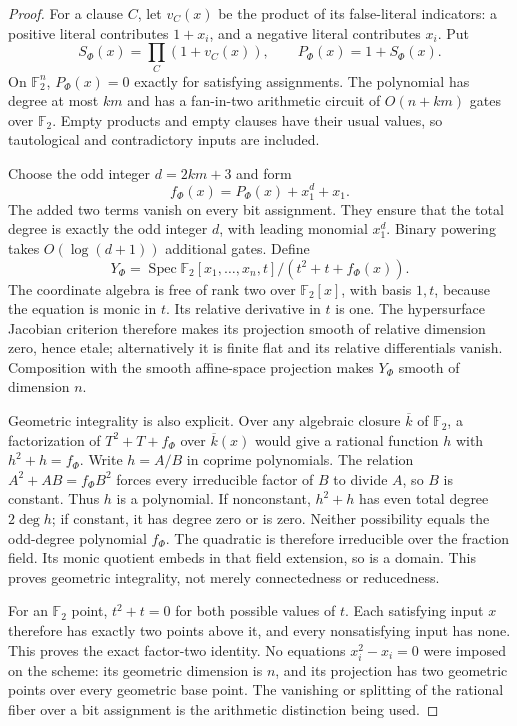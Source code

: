 \begin{proof}
For a clause $C$, let $v_C(x)$ be the product of its false-literal indicators: a positive literal contributes $1+x_i$, and a negative literal contributes $x_i$. Put
\[
 S_\Phi(x)=\prod_C(1+v_C(x)),\qquad P_\Phi(x)=1+S_\Phi(x).
\]
On $\mathbb F_2^n$, $P_\Phi(x)=0$ exactly for satisfying assignments. The polynomial has degree at most $km$ and has a fan-in-two arithmetic circuit of $O(n+km)$ gates over $\mathbb F_2$. Empty products and empty clauses have their usual values, so tautological and contradictory inputs are included.

Choose the odd integer $d=2km+3$ and form
\[
        f_\Phi(x)=P_\Phi(x)+x_1^d+x_1.
\]
The added two terms vanish on every bit assignment. They ensure that the total degree is exactly the odd integer $d$, with leading monomial $x_1^d$. Binary powering takes $O(\log(d+1))$ additional gates. Define
\[
 Y_\Phi=\operatorname{Spec}
 \mathbb F_2[x_1,\ldots,x_n,t]/(t^2+t+f_\Phi(x)).
\]
The coordinate algebra is free of rank two over $\mathbb F_2[x]$, with basis $1,t$, because the equation is monic in $t$. Its relative derivative in $t$ is one. The hypersurface Jacobian criterion therefore makes its projection smooth of relative dimension zero, hence etale; alternatively it is finite flat and its relative differentials vanish. Composition with the smooth affine-space projection makes $Y_\Phi$ smooth of dimension $n$.

Geometric integrality is also explicit. Over any algebraic closure $\overline k$ of $\mathbb F_2$, a factorization of $T^2+T+f_\Phi$ over $\overline k(x)$ would give a rational function $h$ with $h^2+h=f_\Phi$. Write $h=A/B$ in coprime polynomials. The relation $A^2+AB=f_\Phi B^2$ forces every irreducible factor of $B$ to divide $A$, so $B$ is constant. Thus $h$ is a polynomial. If nonconstant, $h^2+h$ has even total degree $2\deg h$; if constant, it has degree zero or is zero. Neither possibility equals the odd-degree polynomial $f_\Phi$. The quadratic is therefore irreducible over the fraction field. Its monic quotient embeds in that field extension, so is a domain. This proves geometric integrality, not merely connectedness or reducedness.

For an $\mathbb F_2$ point, $t^2+t=0$ for both possible values of $t$. Each satisfying input $x$ therefore has exactly two points above it, and every nonsatisfying input has none. This proves the exact factor-two identity. No equations $x_i^2-x_i=0$ were imposed on the scheme: its geometric dimension is $n$, and its projection has two geometric points over every geometric base point. The vanishing or splitting of the rational fiber over a bit assignment is the arithmetic distinction being used.


\end{proof}
